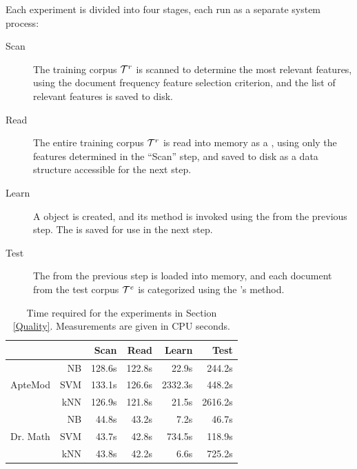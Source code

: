Each experiment is divided into four stages, each run as a separate
system process:

\begin{description}
\item[Scan] The training corpus $\mathcal{T}^r$ is scanned to determine the
  most relevant features, using the document frequency feature
  selection criterion, and the list of relevant features is saved to
  disk.
\item[Read] The entire training corpus $\mathcal{T}^r$ is read into memory as
  a , using only the features determined in the
  ``Scan'' step, and saved to disk as a data structure accessible for the
  next step.
\item[Learn] A  object is created, and its
   method is invoked using the  from
  the previous step.  The  is saved for use in the next
  step.
\item[Test] The  from the previous step is loaded into
  memory, and each document from the test corpus $\mathcal{T}^e$ is
  categorized using the 's  method.
\end{description}

\begin{table}
\begin{center}
\begin{tabular}{|c|r|r r r r|}
\cline{3-6}
\multicolumn{2}{c|}{}
                 &  Scan  &  Read   &  Learn  &  Test   \\ \hline
           & NB  & 128.6s & 122.8s  &   22.9s &  244.2s \\
ApteMod    & SVM & 133.1s & 126.6s  & 2332.3s &  448.2s \\
           & kNN & 126.9s & 121.8s  &   21.5s & 2616.2s \\ \hline
           & NB  &  44.8s &  43.2s  &    7.2s &   46.7s \\
Dr. Math   & SVM &  43.7s &  42.8s  &  734.5s &  118.9s \\
           & kNN &  43.8s &  42.2s  &    6.6s &  725.2s \\ \hline
\end{tabular}
\end{center}
\caption[Time required for the experiments in Section \ref{Quality}]
 {Time required for the experiments in Section \ref{Quality}.
  Measurements are given in CPU seconds.}
\label{eval-time}
\end{table}


